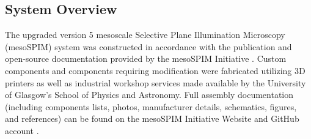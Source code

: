 \subsection{System Overview}
The upgraded version 5 mesoscale Selective Plane Illumination Microscopy (mesoSPIM) system was constructed in accordance with the publication and open-source documentation provided by the mesoSPIM Initiative \cite{voigt_mesospim_2019,vladimirov_benchtop_2024}. Custom components and components requiring modification were fabricated utilizing 3D printers as well as industrial workshop services made available by the University of Glasgow’s School of Physics and Astronomy. Full assembly documentation (including components lists, photos, manufacturer details, schematics, figures, and references) can be found on the mesoSPIM Initiative Website and GitHub account \cite{vladimirov_mesospimbenchtop-hardware_2025}.

